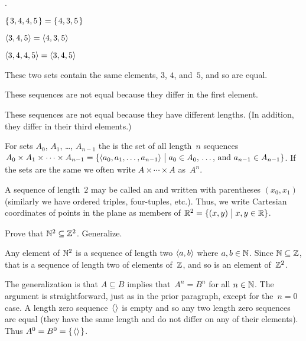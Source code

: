 \documentclass{ibl}
\begin{document}
\begin{ex}\pord.
\begin{exes}
\item $\mbox{$\{\hspace{0.1em}3, 4, 4, 5\hspace{0.1em}\}$}=\mbox{$\{\hspace{0.1em}4, 3, 5\hspace{0.1em}\}$}$
\item $\langle3, 4, 5\rangle=\langle4, 3, 5\rangle$
\item $\langle3, 4, 4, 5\rangle=\langle3,4,5\rangle$  
\end{exes}
\begin{ans}
\begin{exes}
\item These two sets contain the same elements, $3$, $4$, and~$5$,
  and so are equal.
\item These sequences are not equal because they differ in the first element.
\item These sequences are not equal because they have different lengths.
  (In addition, they differ in their third elements.)
\end{exes}
\end{ans}
\end{ex}

\begin{df}
For sets $A_0$, $A_1$, \ldots, $A_{n-1}$
the  
is the set of all length~$n$ sequences
$A_0\times A_1\times \cdots \times A_{n-1}
  =\{\langle a_0,a_1,\ldots,a_{n-1}\rangle \bigm| \text{$a_0\in A_0$, \ldots, and~$a_{n-1}\in A_{n-1}$}\}$.
If the sets are the same we often write $A\times\cdots\times A$ 
as~$A^n$.
\end{df}

A sequence of length~$2$ may be called an  and 
written with parentheses $(x_0,x_1)$
(similarly we have ordered triples, four-tuples, etc.).
Thus, we write 
Cartesian coordinates of points in the plane as members of
$\mathbb{R}^2=\{(x,y) \bigm| x,y\in\mathbb{R}\}$.

\begin{ex}
Prove that $\mathbb{N}^2\subseteq \mathbb{Z}^2$.
Generalize. 
\begin{ans}
Any element of $\mathbb{N}^2$ is a sequence of length two $\langle a,b\rangle$ where
$a,b\in\mathbb{N}$.
Since $\mathbb{N}\subseteq\mathbb{Z}$, that is a sequence of length two of elements of~$\mathbb{Z}$, 
and so is an element of~$\mathbb{Z}^2$.

The generalization is that $A\subseteq B$ implies that~$A^n=B^n$ for all 
$n\in\mathbb{N}$.
The argument is straightforward, just as in the prior paragraph,
except for the~$n=0$ case.
A length zero sequence~$\langle\rangle$ is empty and so any two 
length zero sequences are equal (they have the same length and do not 
differ on any of their elements).
Thus $A^0=B^0=\mbox{$\{\hspace{0.1em}\langle\rangle\hspace{0.1em}\}$}$.
\end{ans}
\end{ex}
\end{document}
